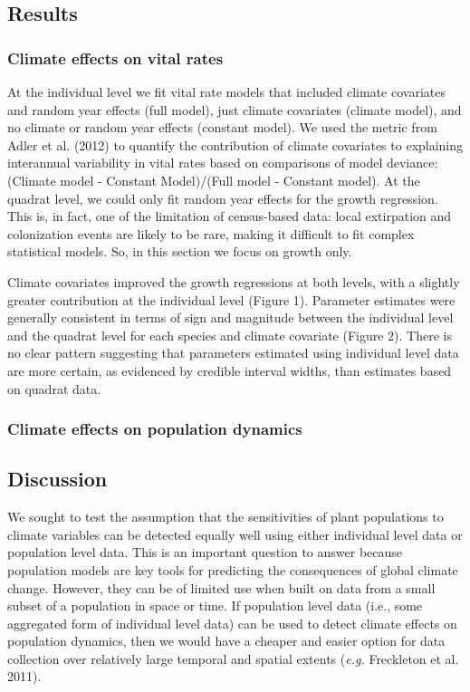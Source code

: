 \documentclass[12pt,]{article}
\begin{document}
\subsection{Results}\label{results}

\subsubsection{Climate effects on vital
rates}\label{climate-effects-on-vital-rates}

At the individual level we fit vital rate models that included climate
covariates and random year effects (full model), just climate covariates
(climate model), and no climate or random year effects (constant model).
We used the metric from Adler et al. (2012) to quantify the contribution
of climate covariates to explaining interannual variability in vital
rates based on comparisons of model deviance: (Climate model - Constant
Model)/(Full model - Constant model). At the quadrat level, we could
only fit random year effects for the growth regression. This is, in
fact, one of the limitation of census-based data: local extirpation and
colonization events are likely to be rare, making it difficult to fit
complex statistical models. So, in this section we focus on growth only.

Climate covariates improved the growth regressions at both levels, with
a slightly greater contribution at the individual level (Figure 1).
Parameter estimates were generally consistent in terms of sign and
magnitude between the individual level and the quadrat level for each
species and climate covariate (Figure 2). There is no clear pattern
suggesting that parameters estimated using individual level data are
more certain, as evidenced by credible interval widths, than estimates
based on quadrat data.

\subsubsection{Climate effects on population
dynamics}\label{climate-effects-on-population-dynamics}

\subsection{Discussion}\label{discussion}

We sought to test the assumption that the sensitivities of plant
populations to climate variables can be detected equally well using
either individual level data or population level data. This is an
important question to answer because population models are key tools for
predicting the consequences of global climate change. However, they can
be of limited use when built on data from a small subset of a population
in space or time. If population level data (i.e., some aggregated form
of individual level data) can be used to detect climate effects on
population dynamics, then we would have a cheaper and easier option for
data collection over relatively large temporal and spatial extents
(\emph{e.g.} Freckleton et al. 2011).
\end{document}
